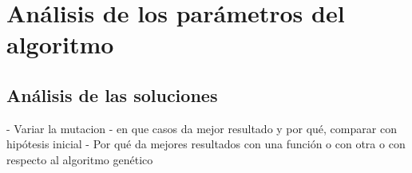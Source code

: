 \chapter{Análisis de los parámetros del algoritmo}







\section{Análisis de las soluciones}

- Variar la mutacion
- en que casos da mejor resultado y por qué, comparar con hipótesis inicial
- Por qué da mejores resultados con una función o con otra o con respecto al algoritmo genético
